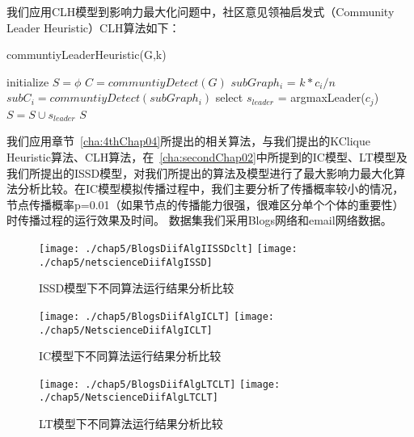 我们应用CLH模型到影响力最大化问题中，社区意见领袖启发式（Community Leader Heuristic）CLH算法如下：
\begin{algorithm}
	\caption{communtiyLeaderHeuristic(G,k)}
	\label{communityIM}
	\begin{algorithmic}[1]
		\STATE initialize $S = \phi$
		\STATE $C=communtiyDetect(G)$
		\STATE $subGraph_{i}$ = $k * c_i/n$
		\STATE $subC_i = communtiyDetect(subGraph_{i})$
		\STATE select $s_{leader}$ = argmaxLeader($c_j$)
		\STATE $S = S \cup s_{leader} $ 
		\ENDFOR
		\ENDFOR
		\RETURN $S$
	\end{algorithmic}
\end{algorithm}

我们应用章节~\ref{cha:4thChap04}所提出的相关算法，与我们提出的KClique Heuristic算法、CLH算法，在~\ref{cha:secondChap02}中所提到的IC模型、LT模型及我们所提出的ISSD模型，对我们所提出的算法及模型进行了最大影响力最大化算法分析比较。在IC模型模拟传播过程中，我们主要分析了传播概率较小的情况，节点传播概率p=0.01（如果节点的传播能力很强，很难区分单个个体的重要性）时传播过程的运行效果及时间。
数据集我们采用Blogs网络和email网络数据。
\begin{figure}[H]
	\centering%
	{\texttt{[image: ./chap5/BlogsDiifAlgIISSDclt]}}
	{\texttt{[image: ./chap5/netscienceDiifAlgISSD]}}
	
	\caption{ISSD模型下不同算法运行结果分析比较}
\end{figure}

\begin{figure}[H]
	\centering%
	{\texttt{[image: ./chap5/BlogsDiifAlgICLT]}}
	{\texttt{[image: ./chap5/NetscienceDiifAlgICLT]}}
	
	\caption{IC模型下不同算法运行结果分析比较}
\end{figure}

\begin{figure}[H]
	\centering%
	{\texttt{[image: ./chap5/BlogsDiifAlgLTCLT]}}
	{\texttt{[image: ./chap5/NetscienceDiifAlgLTCLT]}}
	
	\caption{LT模型下不同算法运行结果分析比较}
\end{figure}


